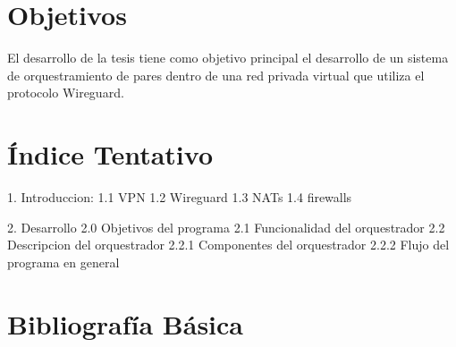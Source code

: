 \documentclass{article}
\begin{document}
\section{Objetivos}

El desarrollo de la tesis tiene como objetivo principal el desarrollo de un sistema de orquestramiento de pares dentro de una red privada virtual que utiliza el protocolo Wireguard.


\section{Índice Tentativo}

1. Introduccion:
    1.1 VPN
    1.2 Wireguard
    1.3 NATs
    1.4 firewalls

2. Desarrollo
    2.0 Objetivos del programa
    2.1 Funcionalidad del orquestrador
    2.2 Descripcion del orquestrador
    2.2.1 Componentes del orquestrador
    2.2.2 Flujo del programa en general


\section{Bibliografía Básica}
\end{document}
